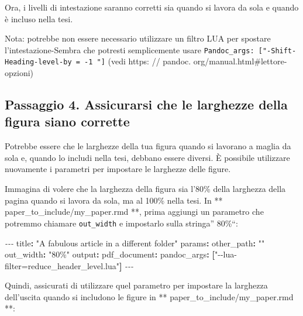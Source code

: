 \documentclass[a4paper, 11pt, nobind]{templates/ociamthesis}
\newenvironment{Shaded}{\begin{snugshade}}{\end{snugshade}}
\newcommand{\AttributeTok}[1]{\textcolor[rgb]{0.77,0.63,0.00}{#1}}
\newcommand{\FunctionTok}[1]{\textcolor[rgb]{0.00,0.00,0.00}{#1}}
\newcommand{\KeywordTok}[1]{\textcolor[rgb]{0.13,0.29,0.53}{\textbf{#1}}}
\newcommand{\PreprocessorTok}[1]{\textcolor[rgb]{0.56,0.35,0.01}{\textit{#1}}}
\newcommand{\StringTok}[1]{\textcolor[rgb]{0.31,0.60,0.02}{#1}}
\renewenvironment{Shaded}
{
  \vspace{10pt}%
  \begin{snugshade}%
}{%
  \end{snugshade}%
  \vspace{8pt}%
}
\begin{document}
Ora, i livelli di intestazione saranno corretti sia quando si lavora da sola e quando è incluso nella tesi.

Nota: potrebbe non essere necessario utilizzare un filtro LUA per spostare l'intestazione-Sembra che potresti semplicemente usare \texttt{Pandoc\_args:\ {[}"-Shift-Heading-level-by\ =\ -1\ "{]}} (vedi https: // pandoc. org/manual.html\#lettore-opzioni)

\hypertarget{passaggio-4.-assicurarsi-che-le-larghezze-della-figura-siano-corrette}{%
\subsection{Passaggio 4. Assicurarsi che le larghezze della figura siano corrette}\label{passaggio-4.-assicurarsi-che-le-larghezze-della-figura-siano-corrette}}

Potrebbe essere che le larghezze della tua figura quando si lavorano a maglia da sola e, quando lo includi nella tesi, debbano essere diversi.
È possibile utilizzare nuovamente i parametri per impostare le larghezze delle figure.

Immagina di volere che la larghezza della figura sia l'80\% della larghezza della pagina quando si lavora da sola, ma al 100\% nella tesi.
In ** paper\_to\_include/my\_paper.rmd **, prima aggiungi un parametro che potremmo chiamare \texttt{out\_width} e impostarlo sulla stringa'' 80\%``:

\begin{Shaded}
\begin{Highlighting}[]
\PreprocessorTok{{-}{-}{-}}
\FunctionTok{title}\KeywordTok{:}\AttributeTok{ }\StringTok{"A fabulous article in a different folder"}
\FunctionTok{params}\KeywordTok{:}
\AttributeTok{  }\FunctionTok{other\_path}\KeywordTok{:}\AttributeTok{ }\StringTok{""}
\AttributeTok{  }\FunctionTok{out\_width}\KeywordTok{:}\AttributeTok{ }\StringTok{"80\%"}
\FunctionTok{output}\KeywordTok{:}
\AttributeTok{  }\FunctionTok{pdf\_document}\KeywordTok{:}\AttributeTok{ }
\AttributeTok{    }\FunctionTok{pandoc\_args}\KeywordTok{:}\AttributeTok{ }\KeywordTok{[}\StringTok{"{-}{-}lua{-}filter=reduce\_header\_level.lua"}\KeywordTok{]}
\PreprocessorTok{{-}{-}{-}}
\end{Highlighting}
\end{Shaded}

Quindi, assicurati di utilizzare quel parametro per impostare la larghezza dell'uscita quando si includono le figure in ** paper\_to\_include/my\_paper.rmd **:
\end{document}
